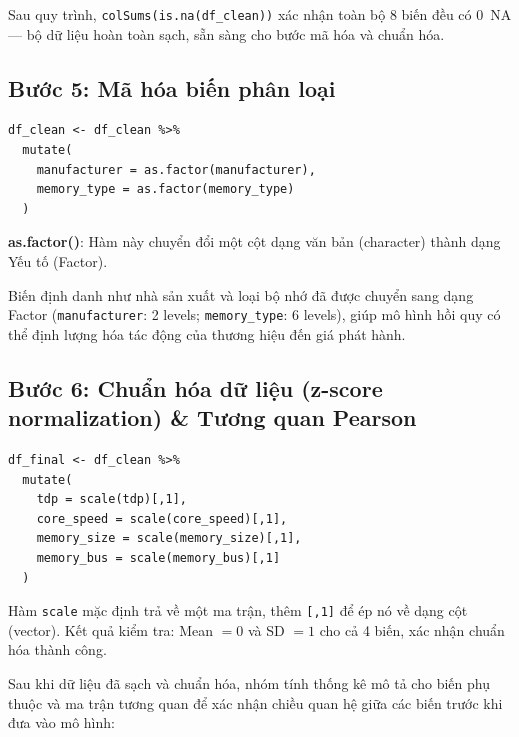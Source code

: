 \documentclass[a4paper]{article}
\begin{document}
Sau quy trình, \texttt{colSums(is.na(df\_clean))} xác nhận toàn bộ 8 biến đều có 0~NA --- bộ dữ liệu hoàn toàn sạch, sẵn sàng cho bước mã hóa và chuẩn hóa.

\subsection{Bước 5: Mã hóa biến phân loại}


\begin{verbatim}
df_clean <- df_clean %>%
  mutate(
    manufacturer = as.factor(manufacturer),
    memory_type = as.factor(memory_type)
  )
\end{verbatim}

\textbf{as.factor()}: Hàm này chuyển đổi một cột dạng văn bản (character) thành dạng Yếu tố (Factor).

Biến định danh như nhà sản xuất và loại bộ nhớ đã được chuyển sang dạng Factor (\texttt{manufacturer}: 2 levels; \texttt{memory\_type}: 6 levels), giúp mô hình hồi quy có thể định lượng hóa tác động của thương hiệu đến giá phát hành.

\subsection{Bước 6: Chuẩn hóa dữ liệu (z-score normalization) \& Tương quan Pearson}


\begin{verbatim}
df_final <- df_clean %>%
  mutate(
    tdp = scale(tdp)[,1],
    core_speed = scale(core_speed)[,1],
    memory_size = scale(memory_size)[,1],
    memory_bus = scale(memory_bus)[,1]
  )
\end{verbatim}

Hàm \texttt{scale} mặc định trả về một ma trận, thêm \texttt{[,1]} để ép nó về dạng cột (vector). Kết quả kiểm tra: Mean $= 0$ và SD $= 1$ cho cả 4 biến, xác nhận chuẩn hóa thành công.

Sau khi dữ liệu đã sạch và chuẩn hóa, nhóm tính thống kê mô tả cho biến phụ thuộc và ma trận tương quan để xác nhận chiều quan hệ giữa các biến trước khi đưa vào mô hình:
\end{document}
